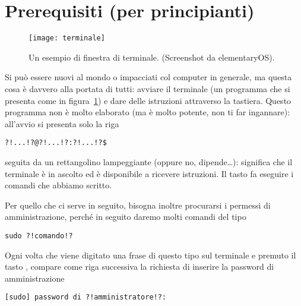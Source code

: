 
\section*{Prerequisiti (per principianti)}

\begin{figure}
\centering
\texttt{[image: terminale]}
\caption{Un esempio di finestra di terminale. (Screenshot da {\sf elementaryOS}).}
\label{fig:terminale}
\end{figure}

Si può essere nuovi al mondo \gnulinux{} o impacciati col computer in generale, ma questa cosa è davvero alla portata di tutti: avviare il terminale (un programma che si presenta come in figura~\ref{fig:terminale}) e dare delle istruzioni attraverso la tastiera. Questo programma non è molto elaborato (ma è molto potente, non ti far ingannare): all'avvio si presenta solo la riga
\begin{lstlisting}
?!...!?@?!...!?:?!...!?$
\end{lstlisting}
seguita da un rettangolino lampeggiante (oppure no, dipende\dots{}): significa che il terminale è in ascolto ed è disponibile a ricevere istruzioni. Il tasto \invio{} fa eseguire i comandi che abbiamo scritto.

Per quello che ci serve in seguito, bisogna inoltre procurarsi i permessi di amministrazione, perché in seguito daremo molti comandi del tipo
\begin{lstlisting}
sudo ?!comando!?
\end{lstlisting}
Ogni volta che viene digitato una frase di questo tipo sul terminale e premuto il tasto \invio{}, compare come riga successiva la richiesta di inserire la password di amministrazione
\begin{lstlisting}
[sudo] password di ?!amministratore!?:
\end{lstlisting}
